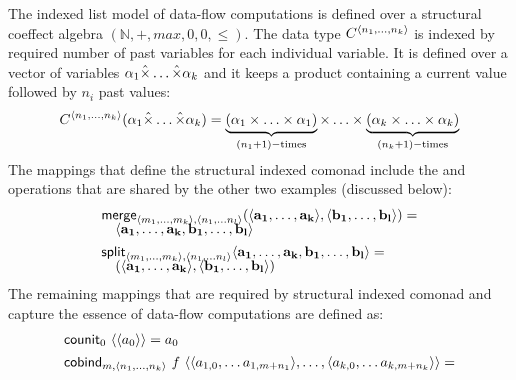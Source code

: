 \begin{example}
The indexed list model of data-flow computations is defined over a structural coeffect
algebra $(\mathbb{N}, +, \mathit{max}, 0, 0, \leq)$. The data type $\ctyp{\langle n_1, \ldots, n_k\rangle}$
is indexed by required number of past variables for each individual variable. It is defined
over a vector of variables $\alpha_1 \hat{\times} \ldots \hat{\times} \alpha_k$ and it keeps a product
containing a current value followed by $n_i$ past values:
%
\begin{equation*}
C^{\langle n_1, \ldots, n_k\rangle}(\alpha_1 \hat{\times} \ldots \hat{\times} \alpha_k) = 
\underbrace{(\alpha_1 \times \ldots \times \alpha_1)}_{(n_1+1)-\textnormal{times}} \times \ldots \times
  \underbrace{(\alpha_k \times \ldots \times \alpha_k)}_{(n_k+1)-\textnormal{times}}
\end{equation*}
%
The mappings that define the structural indexed comonad include the  and 
operations that are shared by the other two examples (discussed below):
%
\begin{equation*}
\begin{array}{l}
\textnormal{\sffamily merge}_{\langle m_1, \ldots, m_k \rangle, \langle n_1, \ldots n_l \rangle} 
  (\langle \mathbf{a_1}, \ldots, \mathbf{a_k} \rangle, \langle \mathbf{b_1}, \ldots, \mathbf{b_l}\rangle) = \\[-0.25em]
\quad \langle \mathbf{a_1}, \ldots, \mathbf{a_k}, \mathbf{b_1}, \ldots, \mathbf{b_l}\rangle
\\[0.45em]
\textnormal{\sffamily split}_{\langle m_1, \ldots, m_k \rangle, \langle n_1, \ldots n_l \rangle} 
   \langle \mathbf{a_1}, \ldots, \mathbf{a_k}, \mathbf{b_1}, \ldots, \mathbf{b_l}\rangle = \\[-0.25em]
\quad (\langle \mathbf{a_1}, \ldots, \mathbf{a_k} \rangle, \langle \mathbf{b_1}, \ldots, \mathbf{b_l}\rangle)
\end{array}
\end{equation*}
%
The remaining mappings that are required by structural indexed comonad and capture the
essence of data-flow computations are defined as:
%
\begin{equation*}
\begin{array}{l}
\textnormal{\sffamily counit}_{0}~\langle \langle a_0 \rangle \rangle = a_0
\\[0.45em]
\textnormal{\sffamily cobind}_{m, \langle n_1, \ldots, n_k \rangle}~f~
  \langle \langle a_{1,0}, \ldots a_{1,m+{n_1}} \rangle, \ldots, \langle a_{k,0}, \ldots a_{k,m+{n_k}} \rangle \rangle = \\[-0.25em]

\end{array}
\end{equation*}
\end{example}
